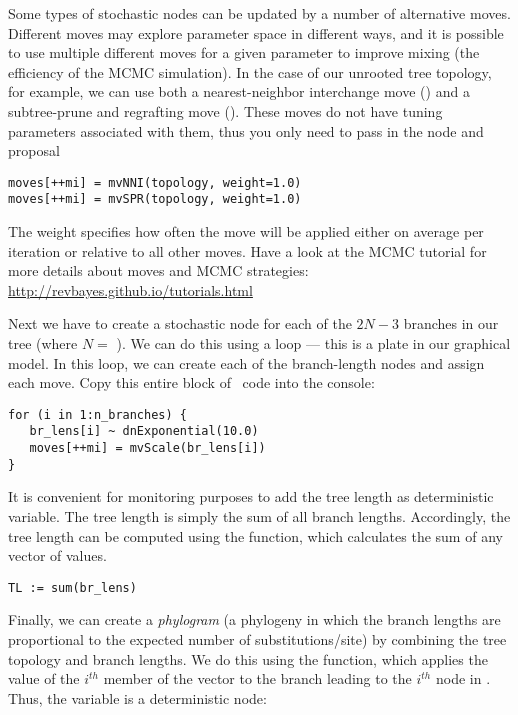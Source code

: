 Some types of stochastic nodes can be updated by a number of alternative moves. 
Different moves may explore parameter space in different ways, and it is possible to use multiple different moves for a given parameter to improve mixing (the efficiency of the MCMC simulation). 
In the case of our unrooted tree topology, for example, we can use both a nearest-neighbor interchange move () and a subtree-prune and regrafting move (). 
These moves do not have tuning parameters associated with them, thus you only need to pass in the  node and proposal  
{\tt \begin{snugshade*}
\begin{lstlisting}
moves[++mi] = mvNNI(topology, weight=1.0)
moves[++mi] = mvSPR(topology, weight=1.0)
\end{lstlisting}
\end{snugshade*}}
The weight specifies how often the move will be applied either on average per iteration or relative to all other moves.
Have a look at the MCMC tutorial for more details about moves and MCMC strategies: \href{http://revbayes.github.io/tutorials.html}{http://revbayes.github.io/tutorials.html}


Next we have to create a stochastic node for each of the $2N-3$ branches in our tree (where $N=$ ). 
We can do this using a  loop --- this is a plate in our graphical model. In this loop, we can create each of the branch-length nodes and assign each move. 
Copy this entire block of \Rev~code into the console:
{\tt \small \begin{snugshade*}
\begin{lstlisting}
for (i in 1:n_branches) {
   br_lens[i] ~ dnExponential(10.0)
   moves[++mi] = mvScale(br_lens[i]) 
}
\end{lstlisting}
\end{snugshade*}}

It is convenient for monitoring purposes to add the tree length as deterministic variable. The tree length is simply the sum of all branch lengths.
Accordingly, the tree length can be computed using the  function, which calculates the sum of any vector of values.
{\tt \begin{snugshade*}
\begin{lstlisting}
TL := sum(br_lens)
\end{lstlisting}
\end{snugshade*}}

Finally, we can create a \emph{phylogram} (a phylogeny in which the branch lengths are proportional to the expected number of substitutions/site) by combining the tree topology and branch lengths.
We do this using the  function, which applies the value of the $i^{th}$ member of the  vector to the branch leading to the $i^{th}$ node in . 
Thus, the  variable is a deterministic node: 

